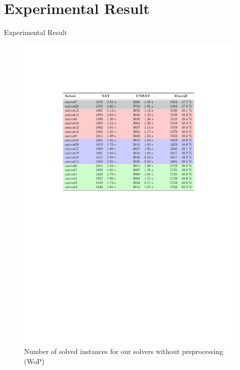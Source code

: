 \documentclass[]{beamer}
\begin{document}
\section{Experimental Result}
\begin{frame}{Experimental Result}
\begin{figure}
    \caption{Number of solved instances for our solvers without preprocessing (WoP)}
    \centering
    \includegraphics[scale=0.7]{../figures/OurSolver.pdf}
\end{figure}
\end{frame}
\end{document}
